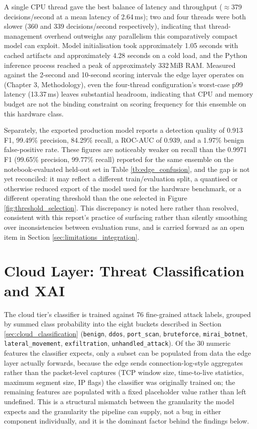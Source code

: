 A single CPU thread gave the best balance of latency and throughput ($\approx$379 decisions/second at a mean latency of 2.64\,ms); two and four threads were both slower (360 and 339 decisions/second respectively), indicating that thread-management overhead outweighs any parallelism this comparatively compact model can exploit. Model initialisation took approximately 1.05 seconds with cached artifacts and approximately 4.28 seconds on a cold load, and the Python inference process reached a peak of approximately 332\,MiB RAM. Measured against the 2-second and 10-second scoring intervals the edge layer operates on (Chapter 3, Methodology), even the four-thread configuration's worst-case p99 latency (13.37\,ms) leaves substantial headroom, indicating that CPU and memory budget are not the binding constraint on scoring frequency for this ensemble on this hardware class.

Separately, the exported production model reports a detection quality of 0.913 F1, 99.49\% precision, 84.29\% recall, a ROC-AUC of 0.939, and a 1.97\% benign false-positive rate. These figures are noticeably weaker on recall than the 0.9971 F1 (99.65\% precision, 99.77\% recall) reported for the same ensemble on the notebook-evaluated held-out set in Table \ref{tb:edge_confusion}, and the gap is not yet reconciled: it may reflect a different train/evaluation split, a quantised or otherwise reduced export of the model used for the hardware benchmark, or a different operating threshold than the one selected in Figure \ref{fig:threshold_selection}. This discrepancy is noted here rather than resolved, consistent with this report's practice of surfacing rather than silently smoothing over inconsistencies between evaluation runs, and is carried forward as an open item in Section \ref{sec:limitations_integration}.

\section{Cloud Layer: Threat Classification and XAI}\label{sec:cloud_eval}

The cloud tier's classifier is trained against 76 fine-grained attack labels, grouped by summed class probability into the eight buckets described in Section \ref{sec:cloud_classification} (\texttt{benign}, \texttt{ddos}, \texttt{port\_scan}, \texttt{bruteforce}, \texttt{mirai\_botnet}, \texttt{lateral\_movement}, \texttt{exfiltration}, \texttt{unhandled\_attack}). Of the 30 numeric features the classifier expects, only a subset can be populated from data the edge layer actually forwards, because the edge sends connection-log-style aggregates rather than the packet-level captures (TCP window size, time-to-live statistics, maximum segment size, IP flags) the classifier was originally trained on; the remaining features are populated with a fixed placeholder value rather than left undefined. This is a structural mismatch between the granularity the model expects and the granularity the pipeline can supply, not a bug in either component individually, and it is the dominant factor behind the findings below.

